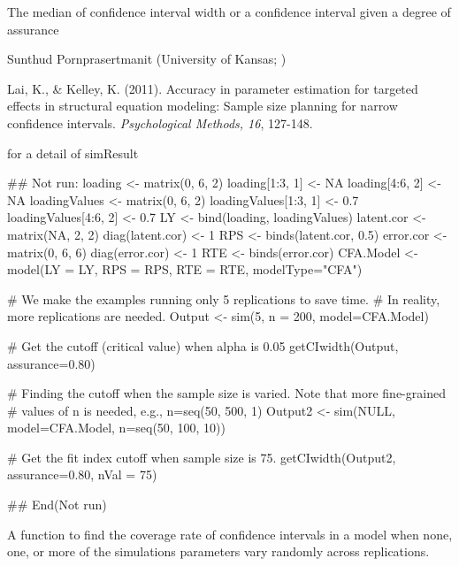 \documentclass[a4paper]{book}
\begin{document}
%
\begin{Value}
The median of confidence interval width or a confidence interval given a degree of assurance
\end{Value}
%
\begin{Author}\relax
Sunthud Pornprasertmanit (University of Kansas; )
\end{Author}
%
\begin{References}\relax
Lai, K., \& Kelley, K. (2011). Accuracy in parameter estimation for targeted effects in structural equation modeling: Sample size planning for narrow confidence intervals. \emph{Psychological Methods, 16}, 127-148.
\end{References}
%
\begin{SeeAlso}\relax
{} for a detail of simResult
\end{SeeAlso}
%
\begin{Examples}
\begin{ExampleCode}
## Not run: 
loading <- matrix(0, 6, 2)
loading[1:3, 1] <- NA
loading[4:6, 2] <- NA
loadingValues <- matrix(0, 6, 2)
loadingValues[1:3, 1] <- 0.7
loadingValues[4:6, 2] <- 0.7
LY <- bind(loading, loadingValues)
latent.cor <- matrix(NA, 2, 2)
diag(latent.cor) <- 1
RPS <- binds(latent.cor, 0.5)
error.cor <- matrix(0, 6, 6)
diag(error.cor) <- 1
RTE <- binds(error.cor)
CFA.Model <- model(LY = LY, RPS = RPS, RTE = RTE, modelType="CFA")

# We make the examples running only 5 replications to save time.
# In reality, more replications are needed.
Output <- sim(5, n = 200, model=CFA.Model)

# Get the cutoff (critical value) when alpha is 0.05
getCIwidth(Output, assurance=0.80)

# Finding the cutoff when the sample size is varied. Note that more fine-grained 
# values of n is needed, e.g., n=seq(50, 500, 1)
Output2 <- sim(NULL, model=CFA.Model, n=seq(50, 100, 10))

# Get the fit index cutoff when sample size is 75.
getCIwidth(Output2, assurance=0.80, nVal = 75)

## End(Not run)
\end{ExampleCode}
\end{Examples}
%
\begin{Description}\relax
A function to find the coverage rate of confidence intervals in a model when none, one, or more of the simulations parameters vary randomly across replications.
\end{Description}
\end{document}
